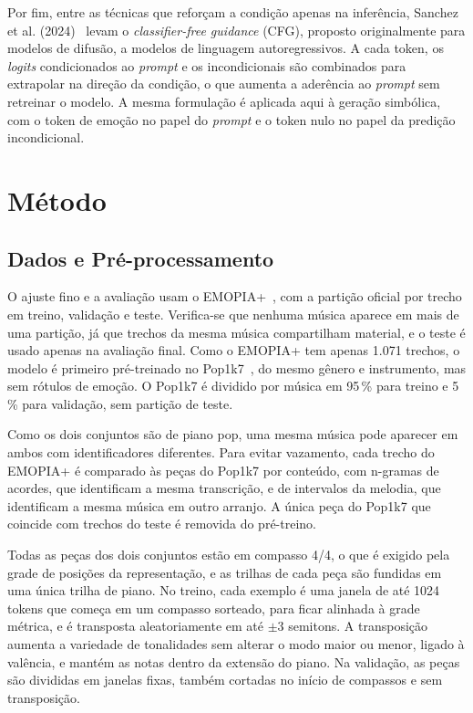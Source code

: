 \documentclass{article}
\begin{document}
Por fim, entre as técnicas que reforçam a condição apenas na inferência, Sanchez
et al. (2024)~\cite{Sanchez2024:cfg} levam o \emph{classifier-free guidance}
(CFG), proposto originalmente para modelos de difusão, a modelos de linguagem
autoregressivos. A cada token, os \emph{logits} condicionados ao \emph{prompt} e
os incondicionais são combinados para extrapolar na direção da condição, o que
aumenta a aderência ao \emph{prompt} sem retreinar o modelo. A mesma formulação
é aplicada aqui à geração simbólica, com o token de emoção no papel do
\emph{prompt} e o token nulo no papel da predição incondicional.

\section{Método}\label{sec:method}

\subsection{Dados e Pré-processamento}

O ajuste fino e a avaliação usam o EMOPIA+~\cite{Huang2024:emodisentanger}, com
a partição oficial por trecho em treino, validação e teste. Verifica-se que
nenhuma música aparece em mais de uma partição, já que trechos da mesma música
compartilham material, e o teste é usado apenas na avaliação final. Como o
EMOPIA+ tem apenas 1.071 trechos, o modelo é primeiro pré-treinado no
Pop1k7~\cite{Hsiao2021:cp}, do mesmo gênero e instrumento, mas sem rótulos de
emoção. O Pop1k7 é dividido por música em 95\,\% para treino e 5\,\% para
validação, sem partição de teste.

Como os dois conjuntos são de piano pop, uma mesma música pode aparecer em ambos
com identificadores diferentes. Para evitar vazamento, cada trecho do EMOPIA+ é
comparado às peças do Pop1k7 por conteúdo, com n-gramas de acordes, que
identificam a mesma transcrição, e de intervalos da melodia, que identificam a
mesma música em outro arranjo. A única peça do Pop1k7 que coincide com trechos
do teste é removida do pré-treino.

Todas as peças dos dois conjuntos estão em compasso 4/4, o que é exigido pela
grade de posições da representação, e as trilhas de cada peça são fundidas em
uma única trilha de piano. No treino, cada exemplo é uma janela de até 1024
tokens que começa em um compasso sorteado, para ficar alinhada à grade métrica,
e é transposta aleatoriamente em até $\pm 3$ semitons. A transposição aumenta a
variedade de tonalidades sem alterar o modo maior ou menor, ligado à valência, e
mantém as notas dentro da extensão do piano. Na validação, as peças são
divididas em janelas fixas, também cortadas no início de compassos e sem
transposição.
\end{document}
